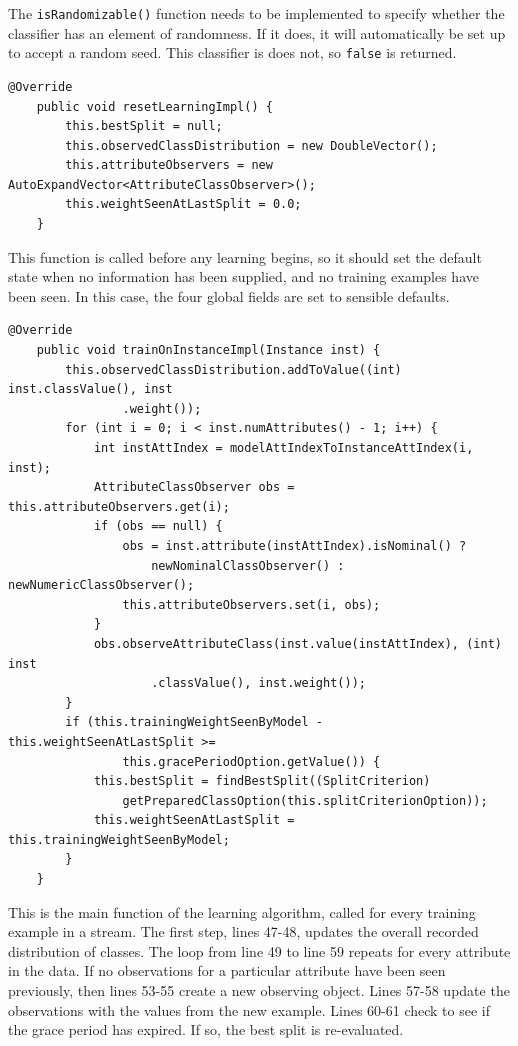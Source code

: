 \documentclass[a4paper,12pt,twoside]{book}
\begin{document}
The \verb+isRandomizable()+ function needs to be implemented to specify whether the classifier has an element of randomness. If it does, it will automatically be set up to accept a random seed. This classifier is does not, so \verb+false+ is returned.

\begin{lstlisting}[caption={Preparing for learning},label=lst:preplearn,firstnumber=37]
	@Override
	public void resetLearningImpl() {
		this.bestSplit = null;
		this.observedClassDistribution = new DoubleVector();
		this.attributeObservers = new AutoExpandVector<AttributeClassObserver>();
		this.weightSeenAtLastSplit = 0.0;
	}
\end{lstlisting}

This function is called before any learning begins, so it should set the default state when no information has been supplied, and no training examples have been seen. In this case, the four global fields are set to sensible defaults.

\begin{lstlisting}[caption={Training on examples},label=lst:train,firstnumber=45]
	@Override
	public void trainOnInstanceImpl(Instance inst) {
		this.observedClassDistribution.addToValue((int) inst.classValue(), inst
				.weight());
		for (int i = 0; i < inst.numAttributes() - 1; i++) {
			int instAttIndex = modelAttIndexToInstanceAttIndex(i, inst);
			AttributeClassObserver obs = this.attributeObservers.get(i);
			if (obs == null) {
				obs = inst.attribute(instAttIndex).isNominal() ?
					newNominalClassObserver() : newNumericClassObserver();
				this.attributeObservers.set(i, obs);
			}
			obs.observeAttributeClass(inst.value(instAttIndex), (int) inst
					.classValue(), inst.weight());
		}
		if (this.trainingWeightSeenByModel - this.weightSeenAtLastSplit >=
				this.gracePeriodOption.getValue()) {
			this.bestSplit = findBestSplit((SplitCriterion)
				getPreparedClassOption(this.splitCriterionOption));
			this.weightSeenAtLastSplit = this.trainingWeightSeenByModel;
		}
	}
\end{lstlisting}

This is the main function of the learning algorithm, called for every training example in a stream. The first step, lines 47-48, updates the overall recorded distribution of classes. The loop from line 49 to line 59 repeats for every attribute in the data. If no observations for a particular attribute have been seen previously, then lines 53-55 create a new observing object. Lines 57-58 update the observations with the values from the new example. Lines 60-61 check to see if the grace period has expired. If so, the best split is re-evaluated.
\end{document}
